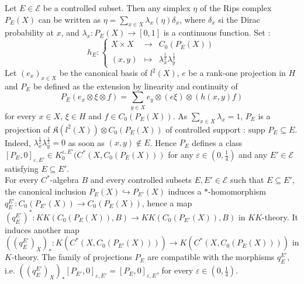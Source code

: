 Let $E\in\mathcal E$ be a controlled subset. Then any simplex $\eta$ of the Rips complex $P_E(X)$ can be written as $\eta = \sum_{x\in X} \lambda_x(\eta) \delta_x$, where $\delta_x$ si the Dirac probability at $x$, and $\lambda_x : P_E(X)\rightarrow [0,1]$ is a continuous function. Set :
\[ h_E : \left\{\begin{array}{rcl} X \times X & \rightarrow & C_0(P_E(X))\\  (x,y) & \mapsto & \lambda_x^{\frac{1}{2}}\lambda_y^{\frac{1}{2}}\end{array}\right. \]  
Let $(e_x)_{x\in X}$ be the canonical basis of $l^2(X)$, $e$ be a rank-one projection in $H$ and $P_E$ be defined as the extension by linearity and continuity of
\[P_E(e_x\otimes\xi\otimes f)= \sum_{y\in X} e_y\otimes (e\xi)\otimes (h(x,y)f)\] 
for every $x\in X$, $\xi\in H$ and $f\in C_0(P_E(X))$. As $\sum_{x\in X} \lambda_x =1$, $P_E$ is a projection of $\mathfrak K(l^2(X)) \otimes C_0(P_E(X))$ of controlled support : $\text{supp }P_E\subseteq E$. Indeed, $\lambda_x^{\frac{1}{2}}\lambda_y^{\frac{1}{2}} =0$ as soon as $(x,y)\notin E$. Hence $P_E$ defines a class $[P_E,0]_{\varepsilon, E'}\in K_0^{\varepsilon, E'} (C^*(X,C_0(P_E(X)))$ for any $\varepsilon\in (0,\frac{1}{4})$ and any $E'\in\mathcal E$ satisfying $E\subseteq E'$.\\

For every $C^*$-algebra $B$ and every controlled subsets $E,E'\in\mathcal E$ such that $E\subseteq E'$, the canonical inclusion $P_E(X)\hookrightarrow P_{E'}(X)$ induces a $*$-homomorphism $q_E^{E'} : C_0(P_{E'}(X))\rightarrow C_0(P_{E}(X))$, hence a map $(q_E^{E'})^* : KK(C_0(P_E(X)),B)\rightarrow KK(C_0(P_{E'}(X)),B)$ in $KK$-theory. It induces another map $((q_E^{E'})_X)_* : K(C^*(X,C_0(P_{E'}(X))))\rightarrow K(C^*(X,C_0(P_{E}(X))))$ in $K$-theory. The family of projections $P_E$ are compatible with the morphisms $q_E^{E'}$, i.e. $((q_E^{E'})_X)_*[P_{E'},0]_{\varepsilon,E'} = [P_{E},0]_{\varepsilon,E}$, for every $\varepsilon\in (0,\frac{1}{4})$.

